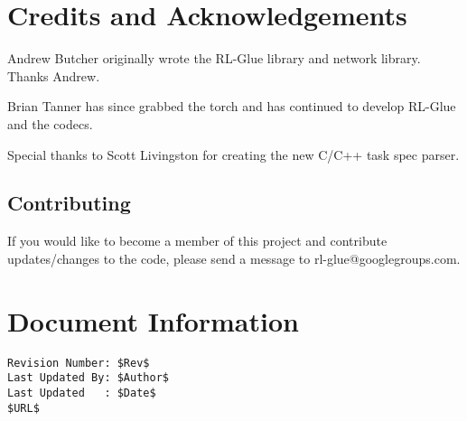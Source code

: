 \documentclass[11pt]{article}
\begin{document}
\section{Credits and Acknowledgements}
Andrew Butcher originally wrote the RL-Glue library and network library.  Thanks Andrew.

Brian Tanner has since grabbed the torch and has continued to develop RL-Glue and the codecs.

Special thanks to Scott Livingston for creating the new C/C++ task spec parser.

\subsection{Contributing}
If you would like to become a member of this project and contribute updates/changes to the code, please send a message to rl-glue@googlegroups.com.


\section*{Document Information}
\begin{verbatim}
Revision Number: $Rev$
Last Updated By: $Author$
Last Updated   : $Date$
$URL$
\end{verbatim}
\end{document}
